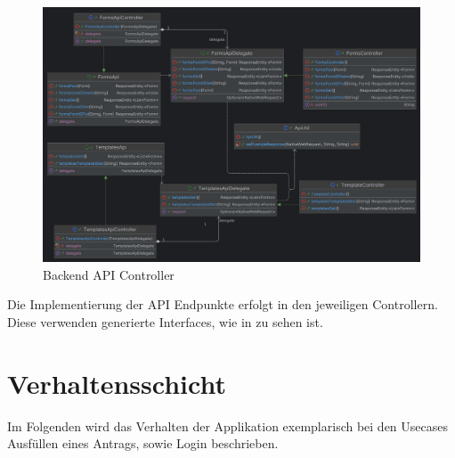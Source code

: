 \begin{figure}[H]
    \centering
    \includegraphics[width=15cm]{images/classDiagrams/Api}
    \caption{Backend API Controller}\label{fig:Backend-API-Controller}
\end{figure}

Die Implementierung der \ac{API} Endpunkte erfolgt in den jeweiligen Controllern.
Diese verwenden generierte Interfaces, wie in  zu sehen ist.


\section{Verhaltensschicht}\label{sec:verhaltensschicht}
Im Folgenden wird das Verhalten der Applikation exemplarisch bei den Usecases Ausfüllen 
eines Antrags, sowie Login beschrieben.


